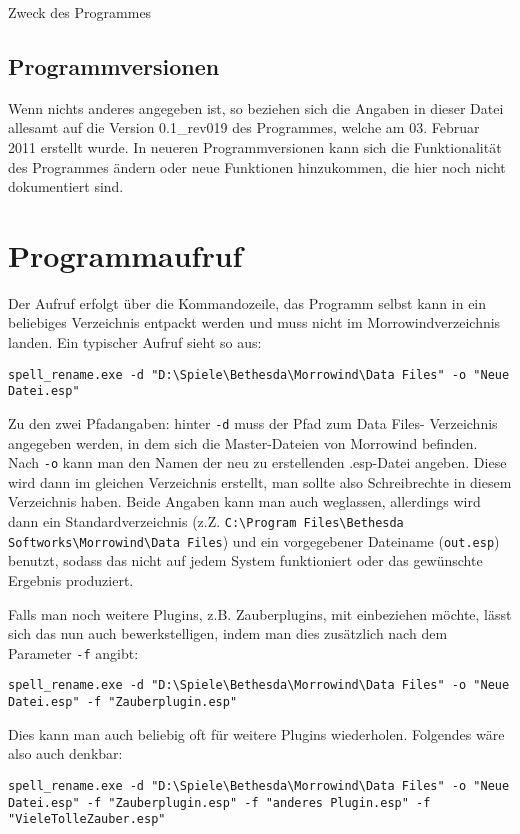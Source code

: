 \documentclass[12pt,oneside,a4paper]{article}
\begin{document}
\begin{section}{Zweck des Programmes}
\subsection{Programmversionen}
Wenn nichts anderes angegeben ist, so beziehen sich die Angaben in dieser Datei
allesamt auf die Version 0.1\_rev019 des Programmes, welche am 03. Februar 2011
erstellt wurde. In neueren Programmversionen kann sich die Funktionalit\"{a}t des
Programmes \"{a}ndern oder neue Funktionen hinzukommen, die hier noch nicht
dokumentiert sind.
\end{section}

\section{Programmaufruf}
Der Aufruf erfolgt \"{u}ber die Kommandozeile, das Programm selbst kann in ein
beliebiges Verzeichnis entpackt werden und muss nicht im Morrowindverzeichnis
landen. Ein typischer Aufruf sieht so aus:

\texttt{spell\_rename.exe -d "D:\textbackslash{}Spiele\textbackslash{}Bethesda\textbackslash{}Morrowind\textbackslash{}Data Files" -o "Neue Datei.esp"}

Zu den zwei Pfadangaben: hinter \texttt{-d} muss der Pfad zum Data Files-
Verzeichnis angegeben werden, in dem sich die Master-Dateien von Morrowind befinden.
Nach \texttt{-o} kann man den Namen der neu zu erstellenden .esp-Datei angeben.
Diese wird dann im gleichen Verzeichnis erstellt, man sollte also Schreibrechte
in diesem Verzeichnis haben. Beide Angaben kann man auch weglassen, allerdings
wird dann ein Standardverzeichnis (z.Z. \texttt{C:\textbackslash{}Program Files\textbackslash{}Bethesda Softworks\textbackslash{}Morrowind\textbackslash{}Data Files})
und ein vorgegebener Dateiname (\texttt{out.esp}) benutzt, sodass das nicht auf
jedem System funktioniert oder das gew\"{u}nschte Ergebnis produziert.

Falls man noch weitere Plugins, z.B. Zauberplugins, mit einbeziehen m\"{o}chte,
l\"{a}sst sich das nun auch bewerkstelligen, indem man dies zus\"{a}tzlich nach
dem Parameter \texttt{-f} angibt:

\texttt{spell\_rename.exe -d "D:\textbackslash{}Spiele\textbackslash{}Bethesda\textbackslash{}Morrowind\textbackslash{}Data Files" -o "Neue Datei.esp" -f "Zauberplugin.esp"}

Dies kann man auch beliebig oft f\"{u}r weitere Plugins wiederholen.
Folgendes w\"{a}re also auch denkbar:

\texttt{spell\_rename.exe -d "D:\textbackslash{}Spiele\textbackslash{}Bethesda\textbackslash{}Morrowind\textbackslash{}Data Files" -o "Neue Datei.esp" -f "Zauberplugin.esp" -f "anderes Plugin.esp" -f "VieleTolleZauber.esp"}
\end{document}
